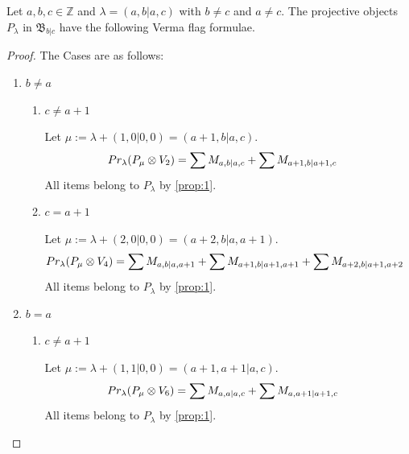 \begin{theorem}
  Let $a,b,c \in \mathbb{Z}$ and $\lambda = (a,b|a,c)$ with $b \neq c$ and $a \neq c$. The projective objects $P_{\lambda}$ in $\mathfrak{B}_{b|c}$ have the following Verma flag formulae.
\end{theorem}
\begin{proof} The Cases are as follows:\par
\begin{enumerate}
  \item $ b \neq a $ 
    \begin{enumerate}
      \item $ c \neq a+1 $\par
      Let $\mu:=\lambda + (1,0|0,0) = (a+1,b|a,c) $.
      \begin{equation}\notag
        \begin{aligned}
          Pr_{\lambda}(P_\mu \otimes V_{2}) &=
\sum M_{a,b|a,c}
+\sum M_{a+1,b|a+1,c}
        \end{aligned}
      \end{equation}
All items belong to $P_\lambda$ by \cref{prop:1}.

      \item $ c = a+1 $\par
      Let $\mu:=\lambda + (2,0|0,0) = (a+2,b|a,a+1) $.
      \begin{equation}\notag
        \begin{aligned}
          Pr_{\lambda}(P_\mu \otimes V_{4}) &=
\sum M_{a,b|a,a+1}
+\sum M_{a+1,b|a+1,a+1}
+\sum M_{a+2,b|a+1,a+2}
        \end{aligned}
      \end{equation}
All items belong to $P_\lambda$ by \cref{prop:1}.
    \end{enumerate}

  \item $ b = a $ 
    \begin{enumerate}
      \item $ c \neq a+1 $\par
      Let $\mu:=\lambda + (1,1|0,0) = (a+1,a+1|a,c) $.
      \begin{equation}\notag
        \begin{aligned}
          Pr_{\lambda}(P_\mu \otimes V_{6}) &=
\sum M_{a,a|a,c}
+\sum M_{a,a+1|a+1,c}
        \end{aligned}
      \end{equation}
All items belong to $P_\lambda$ by \cref{prop:1}.


\end{enumerate}
\end{enumerate}
\end{proof}
